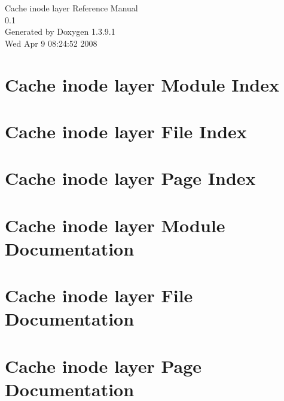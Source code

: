 \documentclass[a4paper]{book}
\begin{document}
\begin{titlepage}
\vspace*{7cm}
\begin{center}
{\Large Cache inode layer Reference Manual\\[1ex]\large 0.1 }\\
\vspace*{1cm}
{\large Generated by Doxygen 1.3.9.1}\\
\vspace*{0.5cm}
{\small Wed Apr 9 08:24:52 2008}\\
\end{center}
\end{titlepage}
\clearemptydoublepage
{}
\tableofcontents
\clearemptydoublepage
{}
\chapter{Cache inode layer Module Index}

\chapter{Cache inode layer File Index}

\chapter{Cache inode layer Page Index}

\chapter{Cache inode layer Module Documentation}


\chapter{Cache inode layer File Documentation}































\chapter{Cache inode layer Page Documentation}

\printindex
\end{document}
